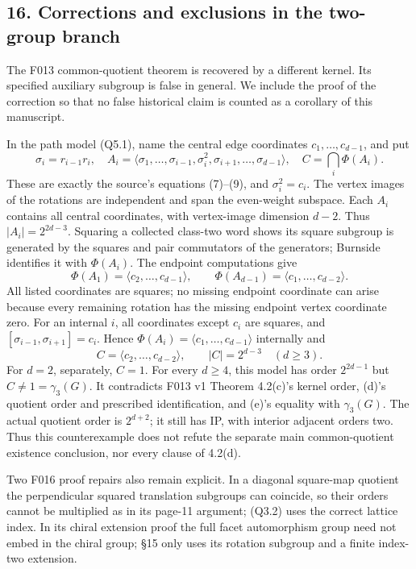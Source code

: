 \documentclass[
  10pt,
  letterpaper,
]{article}
\begin{document}
\subsection{16. Corrections and exclusions in the two-group
branch}\label{corrections-and-exclusions-in-the-two-group-branch}

The F013 common-quotient theorem is recovered by a different kernel. Its
specified auxiliary subgroup is false in general. We include the proof
of the correction so that no false historical claim is counted as a
corollary of this manuscript.

In the path model (Q5.1), name the central edge coordinates
\(c_1,\ldots,c_{d-1}\), and put \[
 \sigma_i=r_{i-1}r_i,\quad
 A_i=\langle\sigma_1,\ldots,\sigma_{i-1},\sigma_i^2,
                  \sigma_{i+1},\ldots,\sigma_{d-1}\rangle,
 \quad C=\bigcap_i\Phi(A_i).                              \tag{Q10.1}
\] These are exactly the source's equations (7)--(9), and
\(\sigma_i^2=c_i\). The vertex images of the rotations are independent
and span the even-weight subspace. Each \(A_i\) contains all central
coordinates, with vertex-image dimension \(d-2\). Thus
\(|A_i|=2^{2d-3}\). Squaring a collected class-two word shows its square
subgroup is generated by the squares and pair commutators of the
generators; Burnside identifies it with \(\Phi(A_i)\). The endpoint
computations give \[
 \Phi(A_1)=\langle c_2,\ldots,c_{d-1}\rangle,\qquad
 \Phi(A_{d-1})=\langle c_1,\ldots,c_{d-2}\rangle.
\] All listed coordinates are squares; no missing endpoint coordinate
can arise because every remaining rotation has the missing endpoint
vertex coordinate zero. For an internal \(i\), all coordinates except
\(c_i\) are squares, and \([\sigma_{i-1},\sigma_{i+1}]=c_i\). Hence
\(\Phi(A_i)=\langle c_1,\ldots,c_{d-1}\rangle\) internally and \[
 C=\langle c_2,\ldots,c_{d-2}\rangle,\qquad |C|=2^{d-3}
 \quad(d\ge3).                                          \tag{Q10.2}
\] For \(d=2\), separately, \(C=1\). For every \(d\ge4\), this model has
order \(2^{2d-1}\) but \(C\ne1=\gamma_3(G)\). It contradicts F013 v1
Theorem 4.2(c)'s kernel order, (d)'s quotient order and prescribed
identification, and (e)'s equality with \(\gamma_3(G)\). The actual
quotient order is \(2^{d+2}\); it still has IP, with interior adjacent
orders two. Thus this counterexample does not refute the separate main
common-quotient existence conclusion, nor every clause of 4.2(d).

Two F016 proof repairs also remain explicit. In a diagonal square-map
quotient the perpendicular squared translation subgroups can coincide,
so their orders cannot be multiplied as in its page-11 argument; (Q3.2)
uses the correct lattice index. In its chiral extension proof the full
facet automorphism group need not embed in the chiral group; §15 only
uses its rotation subgroup and a finite index-two extension.
\end{document}
